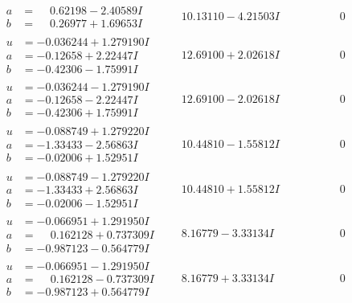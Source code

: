 \documentclass[1p]{elsarticle_modified}
\theoremstyle{definition}
\begin{document}
$$\begin{array}{c|c|c}
\begin{aligned}
a &= \phantom{-}0.62198 - 2.40589 I \\
b &= \phantom{-}0.26977 + 1.69653 I\end{aligned}
 & \phantom{-}10.13110 - 4.21503 I & \phantom{-0.000000 } 0 \\ \hline\begin{aligned}
u &= -0.036244 + 1.279190 I \\
a &= -0.12658 + 2.22447 I \\
b &= -0.42306 - 1.75991 I\end{aligned}
 & \phantom{-}12.69100 + 2.02618 I & \phantom{-0.000000 } 0 \\ \hline\begin{aligned}
u &= -0.036244 - 1.279190 I \\
a &= -0.12658 - 2.22447 I \\
b &= -0.42306 + 1.75991 I\end{aligned}
 & \phantom{-}12.69100 - 2.02618 I & \phantom{-0.000000 } 0 \\ \hline\begin{aligned}
u &= -0.088749 + 1.279220 I \\
a &= -1.33433 - 2.56863 I \\
b &= -0.02006 + 1.52951 I\end{aligned}
 & \phantom{-}10.44810 - 1.55812 I & \phantom{-0.000000 } 0 \\ \hline\begin{aligned}
u &= -0.088749 - 1.279220 I \\
a &= -1.33433 + 2.56863 I \\
b &= -0.02006 - 1.52951 I\end{aligned}
 & \phantom{-}10.44810 + 1.55812 I & \phantom{-0.000000 } 0 \\ \hline\begin{aligned}
u &= -0.066951 + 1.291950 I \\
a &= \phantom{-}0.162128 + 0.737309 I \\
b &= -0.987123 - 0.564779 I\end{aligned}
 & \phantom{-}8.16779 - 3.33134 I & \phantom{-0.000000 } 0 \\ \hline\begin{aligned}
u &= -0.066951 - 1.291950 I \\
a &= \phantom{-}0.162128 - 0.737309 I \\
b &= -0.987123 + 0.564779 I\end{aligned}
 & \phantom{-}8.16779 + 3.33134 I & \phantom{-0.000000 } 0\\

\end{array}$$
\end{document}
